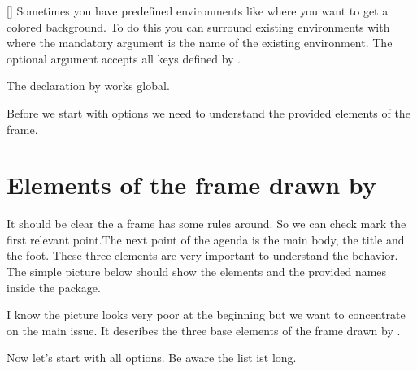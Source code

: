 \documentclass[openany,12pt,tocdepth=3]{ltx-md}
\begin{document}
[\OArgs{}]
Sometimes you have predefined environments like 
where you want to get a colored background. To do this you can 
surround existing environments with 
where the mandatory argument is the name of the existing environment.
The optional argument accepts all keys defined by .
\begin{Note}
The declaration by  works global.
\end{Note}

Before we start with options we need to understand the provided elements of the frame. 

\section{Elements of the frame drawn by \texorpdfstring{}{xframed}}
It should be clear the a frame has some rules around. So we can check mark the first
relevant point.The next point of the agenda is the main body, the title and the foot. These
three elements are very important to understand the behavior. The simple picture below
should show the elements and the provided names inside the package.

\begin{center}
\label{fig:baseelements}
\end{center}
I know the picture looks very poor at the beginning but we want to concentrate on the
main issue. It describes the three base elements of the frame drawn by .

\vspace*{\baselineskip}
Now let's start with all options. Be aware the list ist long. 

\end{document}
